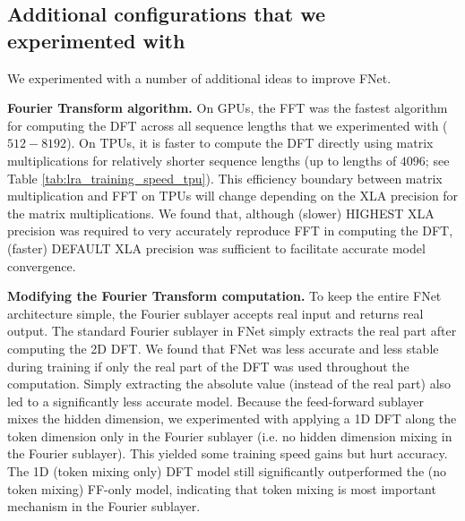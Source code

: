 \documentclass[11pt]{article}
\begin{document}
\subsection{Additional configurations that we experimented with}
\label{app:things_we_tried}

We experimented with a number of additional ideas to improve FNet.

\textbf{Fourier Transform algorithm.} On GPUs, the FFT was the fastest algorithm for computing the DFT across all sequence lengths that we experimented with ($512-8192$). On TPUs, it is faster to compute the DFT directly using matrix multiplications for relatively shorter sequence lengths (up to lengths of $4096$; see Table \ref{tab:lra_training_speed_tpu}). This efficiency boundary between matrix multiplication and FFT on TPUs will change depending on the XLA precision for the matrix multiplications. We found that, although (slower) HIGHEST XLA precision was required to very accurately reproduce FFT in computing the DFT, (faster) DEFAULT XLA precision was sufficient to facilitate accurate model convergence.

\textbf{Modifying the Fourier Transform computation.} To keep the entire FNet architecture simple, the Fourier sublayer accepts real input and returns real output. The standard Fourier sublayer in FNet simply extracts the real part after computing the 2D DFT. We found that FNet was less accurate and less stable during training if only the real part of the DFT was used throughout the computation. Simply extracting the absolute value (instead of the real part) also led to a significantly less accurate model. Because the feed-forward sublayer mixes the hidden dimension, we experimented with  applying a 1D DFT along the token dimension only in the Fourier sublayer (i.e. no hidden dimension mixing in the Fourier sublayer). This yielded some training speed gains but hurt accuracy. The 1D (token mixing only) DFT model still significantly outperformed the (no token mixing) FF-only model, indicating that token mixing is most important mechanism in the Fourier sublayer.
\end{document}
